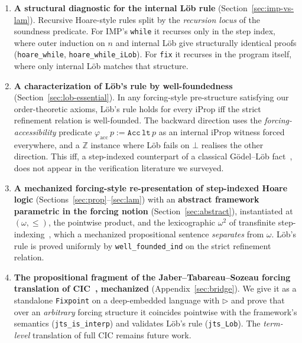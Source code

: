 \begin{enumerate}

\item \textbf{A structural diagnostic for the internal Löb rule}
(Section~\ref{sec:imp-vs-lam}).  Recursive Hoare-style rules split by
the \emph{recursion locus} of the soundness predicate.  For IMP's
\texttt{while} it recurses only in the step index, where outer
induction on $n$ and internal Löb give structurally identical proofs
(\texttt{hoare\_while}, \texttt{hoare\_while\_iLob}).  For \texttt{fix}
it recurses in the program itself, where only internal Löb matches
that structure.

\item \textbf{A characterization of L\"ob's rule by well-foundedness}
(Section~\ref{sec:lob-essential}).  In any forcing-style pre-structure
satisfying our order-theoretic axioms, L\"ob's rule holds for every
iProp iff the strict refinement relation is well-founded.  The
backward direction uses the \emph{forcing-accessibility} predicate
$\varphi_{\mathrm{acc}}\, p := \mathtt{Acc}\, \mathtt{lt}\, p$ as an
internal iProp witness forced everywhere, and a $\mathbb{Z}$ instance
where L\"ob fails on $\bot$ realises the other direction. This iff, a
step-indexed counterpart of a classical Gödel--Löb
fact~\cite{smorynski1985,boolos1993}, does not appear in the
verification literature we surveyed.

\item \textbf{A mechanized forcing-style re-presentation of
step-indexed Hoare logic} (Sections~\ref{sec:prop}--\ref{sec:lam})
with an \textbf{abstract framework parametric in the forcing notion}
(Section~\ref{sec:abstract}), instantiated at $(\omega, \le)$, the
pointwise product, and the lexicographic $\omega^2$ of transfinite
step-indexing~\cite{svendsen2016transfinite,spies2021transfinite},
which a mechanized propositional sentence \emph{separates} from
$\omega$.  Löb's rule is proved uniformly by
\texttt{well\_founded\_ind} on the strict refinement relation.

\item \textbf{The propositional fragment of the
Jaber--Tabareau--Sozeau forcing translation of
CIC~\cite{jaber-tabareau-sozeau-2012}, mechanized}
(Appendix~\ref{sec:bridge}).  We give it as a standalone
\texttt{Fixpoint} on a deep-embedded language with $\triangleright$
and prove that over an \emph{arbitrary} forcing structure it
coincides pointwise with the framework's semantics
(\texttt{jts\_is\_interp}) and validates L\"ob's rule
(\texttt{jts\_Lob}).  The \emph{term-level} translation of full CIC
remains future work.

\end{enumerate}

